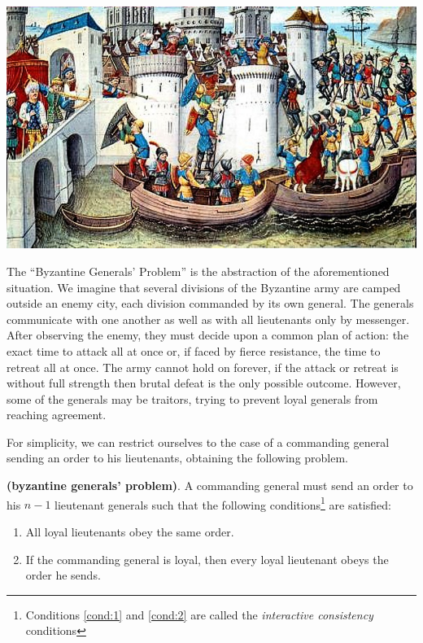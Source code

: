 \bigskip
\begin{center}
	\includegraphics[width=0.9\linewidth]{Images/byzantine.jpeg}
	\label{fig:figure4}
\end{center}

\bigskip
\noindent
The \enquote{Byzantine Generals' Problem} is the abstraction of the aforementioned situation.
We imagine that several divisions of the Byzantine army are camped outside an enemy city, each division commanded by its own general. The generals communicate with one another as well as with all lieutenants only by messenger. After observing the enemy, they must decide upon a common plan of action: the exact time to attack all at once or, if faced by fierce resistance, the time to retreat all at once. The army cannot hold on forever, if the attack or retreat is without full strength then brutal defeat is the only possible outcome. However, some of the generals may be traitors, trying to prevent loyal generals from reaching agreement. 

\bigskip
\noindent
For simplicity, we can restrict ourselves to the case of a commanding general sending an order to his lieutenants, obtaining the following problem.
\begin{mydef}{\bf (byzantine generals' problem)}.
\label{def:bgp}
    A commanding general must send an order to his $n-1$ lieutenant generals such that the following conditions\footnote{Conditions \ref{cond:1} and \ref{cond:2} are called the \textit{interactive consistency} conditions} are satisfied:
    \begin{enumerate}
        \item \label{cond:1} All loyal lieutenants obey the same order.
        \item \label{cond:2} If the commanding general is loyal, then every loyal lieutenant obeys the order he sends.
    \end{enumerate}
\end{mydef}

